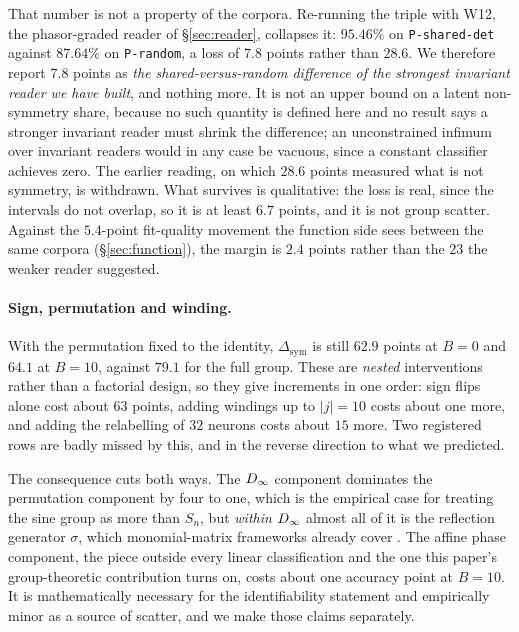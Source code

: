 That number is not a property of the corpora. Re-running the triple with W12, the phasor-graded
reader of \S\ref{sec:reader}, collapses it: $95.46\%$ on \texttt{P-shared-det} against $87.64\%$ on
\texttt{P-random}, a loss of $7.8$ points rather than $28.6$. We therefore report $7.8$ points as
\emph{the shared-versus-random difference of the strongest invariant reader we have built}, and
nothing more. It is not an upper bound on a latent non-symmetry share, because no such quantity is
defined here and no result says a stronger invariant reader must shrink the difference; an
unconstrained infimum over invariant readers would in any case be vacuous, since a constant
classifier achieves zero. The earlier reading, on which $28.6$ points measured what is not symmetry,
is withdrawn. What survives is qualitative: the loss is real, since the intervals do not overlap, so
it is at least $6.7$ points, and it is not group scatter. Against the $5.4$-point fit-quality
movement the function side sees between the same corpora (\S\ref{sec:function}), the margin is
$2.4$ points rather than the $23$ the weaker reader suggested.

\paragraph{Sign, permutation and winding.} With the permutation fixed to the identity,
$\Delta_{\mathrm{sym}}$ is still $62.9$ points at $B=0$ and $64.1$ at $B=10$, against $79.1$ for the
full group. These are \emph{nested} interventions rather than a factorial design, so they give
increments in one order: sign flips alone cost about $63$ points, adding windings up to $|j|=10$
costs about one more, and adding the relabelling of $32$ neurons costs about $15$ more. Two
registered rows are badly missed by this, and in the reverse direction to what we predicted.

The consequence cuts both ways. The $D_\infty$ component dominates the permutation component by four
to one, which is the empirical case for treating the sine group as more than $S_n$, but
\emph{within} $D_\infty$ almost all of it is the reflection generator $\sigma$, which monomial-matrix
frameworks already cover \citep{tran2024monomial}. The affine phase component, the piece outside
every linear classification and the one this paper's group-theoretic contribution turns on, costs
about one accuracy point at $B=10$. It is mathematically necessary for the identifiability statement
and empirically minor as a source of scatter, and we make those claims separately.
